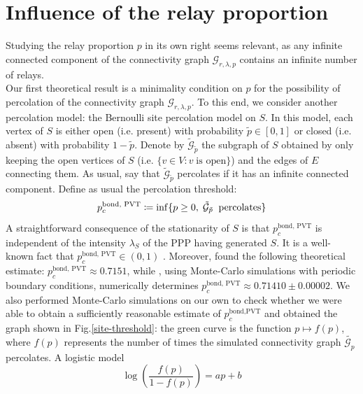 \documentclass[conference]{IEEEtran}
\begin{document}
\section{Influence of the relay proportion}
\label{relay-influence}
Studying the relay proportion $p$ in its own right seems relevant, as any infinite connected component of the connectivity graph $\mathcal{G}_{r,\lambda,p}$ contains an infinite number of relays. \\
\indent Our first theoretical result is a minimality condition on  $p$ for the possibility of percolation of the connectivity graph $\mathcal{G}_{r,\lambda,p}$. %
To this end, we consider another percolation model: the Bernoulli site percolation model \cite{grimmett1999percolation} on $S$. In this model, each vertex of $S$ is either open (i.e. present) with probability $\tilde{p} \in \left[0,1\right]$ or closed (i.e. absent) with probability $1 - \tilde{p}$. Denote by $\tilde{\mathcal{G}}_{\tilde{p}}$ the subgraph of $S$ obtained by only keeping the open vertices of $S$ (i.e. $\lbrace v \in V: v \; \text{is open} \rbrace$) and the edges of $E$ connecting them. As usual, say that $\tilde{\mathcal{G}}_{\tilde{p}}$ percolates \cite{grimmett1999percolation, meester_continuum_1996} if it has an infinite connected component. Define as usual the percolation threshold:
\begin{equation}
\label{critical_site}
p_{c}^{\text{bond, PVT}} \coloneqq \inf \lbrace p \geq 0, \; \tilde{\mathcal{G}}_{\tilde{p}} \text{\: percolates} \rbrace
\end{equation}
A straightforward consequence of the stationarity of $S$ is that $p_{c}^{\text{bond, PVT}}$ is independent of the intensity $\lambda_{S}$ of the PPP having generated $S$. It is a well-known fact that $p_{c}^{\text{bond, PVT}}\in (0,1)$ \cite{grimmett1999percolation, ziesche2016bernoulli}. Moreover, \cite{neher2008topological} found the following theoretical estimate: $p_{c}^{\text{bond, PVT}} \approx 0.7151 $, while \cite{becker_percolation_2009}, using Monte-Carlo simulations with periodic boundary conditions, numerically determines $p_{c}^{\text{bond, PVT}} \approx 0.71410 \pm 0.00002$. We also performed Monte-Carlo simulations on our own to check whether we were able to obtain a sufficiently reasonable estimate of $p_{c}^{\text{bond,PVT}}$ and obtained the graph shown in Fig.\ref{site-threshold}: the green curve is the function $p \mapsto f(p)$, where $f(p)$ represents the number of times the simulated connectivity graph $\tilde{\mathcal{G}_{p}}$ percolates. A logistic model \begin{equation*}
\log\left(\frac{f(p)}{1-f(p)}\right)=ap+b
\end{equation*} 
\end{document}
